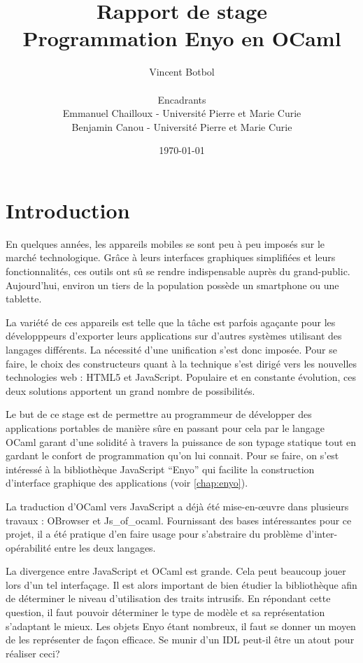 \documentclass[11pt,a4paper]{report}
\title{Rapport de stage\\Programmation Enyo en OCaml}
\author{Vincent Botbol\\
  \\
  Encadrants\\
  Emmanuel Chailloux - Université Pierre et Marie Curie\\
  Benjamin Canou - Université Pierre et Marie Curie
}
\date\today
\begin{document}
\maketitle

\chapter{Introduction}

En quelques années, les appareils mobiles se sont peu à peu imposés sur le marché technologique.
Grâce à leurs interfaces graphiques simplifiées et leurs fonctionnalités, ces outils ont sû se 
rendre indispensable auprès du grand-public.
Aujourd'hui, environ un tiers de la population possède un smartphone ou une tablette.

La variété de ces appareils est telle que la tâche est parfois agaçante pour les développpeurs 
d'exporter leurs applications sur d'autres systèmes utilisant des langages différents.
La nécessité d'une unification s'est donc imposée. Pour se faire, le choix des constructeurs quant à
la technique s'est dirigé vers les nouvelles technologies web :
HTML5 et JavaScript. Populaire et en constante évolution, ces deux solutions apportent un grand nombre
de possibilités.

Le but de ce stage est de permettre au programmeur de développer des applications portables de manière sûre
en passant pour cela par le langage OCaml garant d'une solidité à travers la puissance de son typage statique
tout en gardant le confort de programmation qu'on lui connait.
Pour se faire, on s'est intéressé à la bibliothèque JavaScript ``Enyo'' qui facilite la construction d'interface
graphique des applications (voir \ref{chap:enyo}).

La traduction d'OCaml vers JavaScript a déjà été mise-en-\oe{}uvre dans plusieurs travaux : OBrowser
et Js\_of\_ocaml. Fournissant des bases intéressantes pour ce projet, il a été pratique d'en faire usage
pour s'abstraire du problème d'inter-opérabilité entre les deux langages.

La divergence entre JavaScript et OCaml est grande. Cela peut beaucoup jouer lors d'un tel 
interfaçage. Il est alors important de bien étudier la bibliothèque afin de déterminer le niveau
d'utilisation des traits intrusifs.
En répondant cette question, il faut pouvoir déterminer le type de modèle et sa représentation
s'adaptant le mieux.
Les objets Enyo étant nombreux, il faut se donner un moyen de les représenter 
de façon efficace. Se munir d'un IDL peut-il être un atout pour réaliser ceci?
\end{document}
